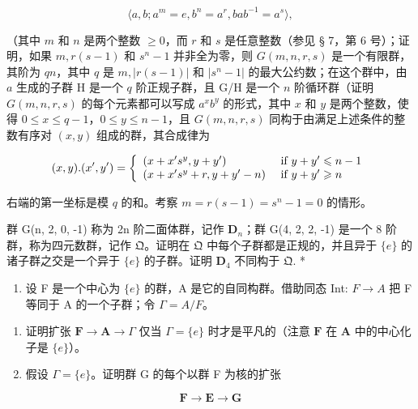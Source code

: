 \[
\langle a, b; a ^ {m} = e, b ^ {n} = a ^ {r}, b a b ^ {- 1} = a ^ {s} \rangle ,
\]

（其中 \(m\) 和 \(n\) 是两个整数 \(\geqslant 0\)，而 \(r\) 和 \(s\) 是任意整数（参见 § 7，第 6 号）；证明，如果 \(m, r(s - 1)\) 和 \(s^n - 1\) 并非全为零，则 \(G(m, n, r, s)\) 是一个有限群，其阶为 \(qn\)，其中 \(q\) 是 \(m, |r(s - 1)|\) 和 \(|s^n - 1|\) 的最大公约数；在这个群中，由 \(a\) 生成的子群 H 是一个 \(q\) 阶正规子群，且 G/H 是一个 \(n\) 阶循环群（证明 \(G(m, n, r, s)\) 的每个元素都可以写成 \(a^x b^y\) 的形式，其中 \(x\) 和 \(y\) 是两个整数，使得 \(0 \leqslant x \leqslant q - 1\)，\(0 \leqslant y \leqslant n - 1\)，且 \(G(m, n, r, s)\) 同构于由满足上述条件的整数有序对 \((x, y)\) 组成的群，其合成律为

\[
(x, y). (x ^ {\prime}, y ^ {\prime}) = \left\{ \begin{array}{l l} (x + x ^ {\prime} s ^ {y}, y + y ^ {\prime}) & \text { if } y + y ^ {\prime} \leqslant n - 1 \\ (x + x ^ {\prime} s ^ {y} + r, y + y ^ {\prime} - n) & \text { if } y + y ^ {\prime} \geqslant n \end{array} \right.
\]

右端的第一坐标是模 \(q\) 的和。考察 \(m = r(s - 1) = s^n - 1 = 0\) 的情形。

群 G(n, 2, 0, -1) 称为 2n 阶二面体群，记作 \(\mathbf{D}_{n}\)；群 G(4, 2, 2, -1) 是一个 8 阶群，称为四元数群，记作 \(\mathfrak{Q}\)。证明在 \(\mathfrak{Q}\) 中每个子群都是正规的，并且异于 \(\{e\}\) 的诸子群之交是一个异于 \(\{e\}\) 的子群。证明 \(\mathbf{D}_{4}\) 不同构于 \(\mathfrak{Q}.\) *

\begin{enumerate}
\def\labelenumi{\arabic{enumi}。}
\setcounter{enumi}{4}
\tightlist
\item
  设 F 是一个中心为 \(\{e\}\) 的群，A 是它的自同构群。借助同态 Int: \(F \rightarrow A\) 把 F 等同于 A 的一个子群；令 \(\Gamma = A/F\)。
\end{enumerate}

\begin{enumerate}
\def\labelenumi{(\alph{enumi})}
\item
  证明扩张 \(\mathbf{F} \to \mathbf{A} \to \Gamma\) 仅当 \(\Gamma = \{e\}\) 时才是平凡的（注意 \(\mathbf{F}\) 在 \(\mathbf{A}\) 中的中心化子是 \(\{e\}\)）。
\item
  假设 \(\Gamma = \{e\}\)。证明群 G 的每个以群 F 为核的扩张
\end{enumerate}

\[
\mathbf {F} \rightarrow \mathbf {E} \rightarrow \mathbf {G}
\]

